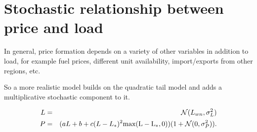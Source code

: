 \documentclass[12pt]{article}
\begin{document}
\section{Stochastic relationship between price and load}

In general, price formation depends on a variety of other variables
in addition to load, for example fuel prices, different unit
availability, import/exports from other regions, etc.

So a more realistic model builds on the quadratic tail model and adds
a multiplicative stochastic component to it.   

\begin{eqnarray}
  L &=& {\cal N}(L_{wn},\sigma_L^2)  \\
  P &=& (a L + b + c(L-L_*)^2\mathrm{max(L-L_*,0)})(1 + {\cal N}(0,\sigma_P^2)).
\end{eqnarray}
\end{document}

